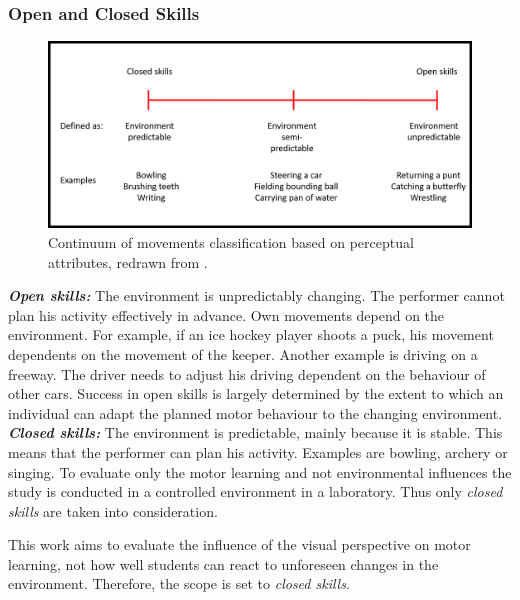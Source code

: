 \subsubsection{Open and Closed Skills}
\begin{figure}[h]
	\centering
	\includegraphics[width=1.0\textwidth]{img/movement_classification2.png}
	\caption{Continuum of movements classification based on perceptual attributes, redrawn from \cite{Schmidt2011}.}
	\label{fig:skills_cont}
\end{figure}
\textit{\textbf{Open skills:}} The environment is unpredictably changing. The performer cannot plan his activity effectively in advance. Own movements depend on the environment. For example, if an ice hockey player shoots a puck, his movement dependents on the movement of the keeper. Another example is driving on a freeway. The driver needs to adjust his driving dependent on the behaviour of other cars. Success in open skills is largely determined by the extent to which an individual can adapt the planned motor behaviour to the changing environment.\\
\textit{\textbf{Closed skills:}} The environment is predictable, mainly because it is stable. This means that the performer can plan his activity. Examples are bowling, archery or singing. To evaluate only the motor learning and not environmental influences the study is conducted in a controlled environment in a laboratory. Thus only \textit{closed skills} are taken into consideration.\\
\begin{tcolorbox}[colback=red!30!white]
This work aims to evaluate the influence of the visual perspective on motor learning, not how well students can react to unforeseen changes in the environment. Therefore, the scope is set to \textit{closed skills}.
\end{tcolorbox}





